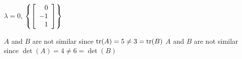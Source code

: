 \begin{enumerate}[!HW!, start=1]
\begin{multicols}{2}
\itemspade $\lambda = 0$, $\left\{\left[\begin{array}{r} 0\\-1\\1 \end{array}\right]\right\}$  %
\end{multicols}

\itemspade $A$ and $B$ are not similar since $\operatorname*{tr}(A) = 5 \neq 3 = \operatorname*{tr}(B)$
\itemspade $A$ and $B$ are not similar since $\det(A) = 4 \neq 6 = \det(B)$

\end{enumerate}